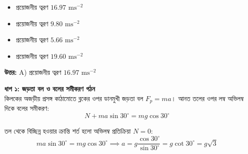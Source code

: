 \documentclass[12pt, a4paper]{article}
\begin{document}
{{\begin{center}
\end{center}
\vspace{1em}

\begin{itemize}[label={}, leftmargin=1cm, itemsep=0.5em]
    \item[\textbf{A)}] প্রয়োজনীয় ত্বরণ $16.97\text{ ms}^{-2}$
    \item[\textbf{B)}] প্রয়োজনীয় ত্বরণ $9.80\text{ ms}^{-2}$
    \item[\textbf{C)}] প্রয়োজনীয় ত্বরণ $5.66\text{ ms}^{-2}$
    \item[\textbf{D)}] প্রয়োজনীয় ত্বরণ $19.60\text{ ms}^{-2}$
\end{itemize}

\vspace{0.5em}
\begin{tcolorbox}[answerbox]
    \textbf{\color{success} উত্তর:} A) প্রয়োজনীয় ত্বরণ $16.97\text{ ms}^{-2}$
\end{tcolorbox}
\vspace{1em}

\begin{tcolorbox}[solutionbox={সমাধান (Solution)}]
    \noindent
    \textbf{ধাপ ১: জড়তা বল ও বলের সমীকরণ গঠন} \\
    কিলকের অজড়ীয় প্রসঙ্গ কাঠামোতে ব্লকের ওপর ডানমুখী জড়তা বল $F_p = m a$। আনত তলের ওপর লম্ব অভিলম্ব দিকে বলের সমীকরণ:
    \[ N + m a \sin 30^\circ = m g \cos 30^\circ \]
    
    তল থেকে বিচ্ছিন্ন হওয়ার ক্রান্তি শর্ত হলো অভিলম্ব প্রতিক্রিয়া $N = 0$:
    \[ m a \sin 30^\circ = m g \cos 30^\circ \implies a = g \frac{\cos 30^\circ}{\sin 30^\circ} = g \cot 30^\circ = g \sqrt{3} \]
    

\end{tcolorbox}}}
\end{document}
